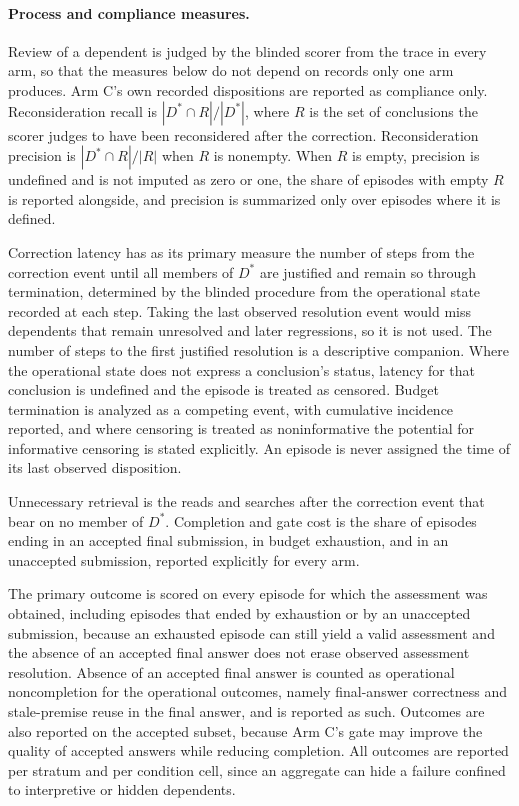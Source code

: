 \documentclass[11pt]{article}
\begin{document}
\paragraph{Process and compliance measures.} Review of a dependent is judged by the blinded scorer from the trace in every arm, so that the measures below do not depend on records only one arm produces. Arm C's own recorded dispositions are reported as compliance only.
Reconsideration recall is $|D^{*}\cap R|/|D^{*}|$, where $R$ is the set of conclusions the scorer judges to have been reconsidered after the correction. Reconsideration precision is $|D^{*}\cap R|/|R|$ when $R$ is nonempty. When $R$ is empty, precision is undefined and is not imputed as zero or one, the share of episodes with empty $R$ is reported alongside, and precision is summarized only over episodes where it is defined.

Correction latency has as its primary measure the number of steps from the correction event until all members of $D^{*}$ are justified and remain so through termination, determined by the blinded procedure from the operational state recorded at each step. Taking the last observed resolution event would miss dependents that remain unresolved and later regressions, so it is not used. The number of steps to the first justified resolution is a descriptive companion. Where the operational state does not express a conclusion's status, latency for that conclusion is undefined and the episode is treated as censored. Budget termination is analyzed as a competing event, with cumulative incidence reported, and where censoring is treated as noninformative the potential for informative censoring is stated explicitly. An episode is never assigned the time of its last observed disposition.

Unnecessary retrieval is the reads and searches after the correction event that bear on no member of $D^{*}$. Completion and gate cost is the share of episodes ending in an accepted final submission, in budget exhaustion, and in an unaccepted submission, reported explicitly for every arm.

The primary outcome is scored on every episode for which the assessment was obtained, including episodes that ended by exhaustion or by an unaccepted submission, because an exhausted episode can still yield a valid assessment and the absence of an accepted final answer does not erase observed assessment resolution. Absence of an accepted final answer is counted as operational noncompletion for the operational outcomes, namely final-answer correctness and stale-premise reuse in the final answer, and is reported as such. Outcomes are also reported on the accepted subset, because Arm C's gate may improve the quality of accepted answers while reducing completion. All outcomes are reported per stratum and per condition cell, since an aggregate can hide a failure confined to interpretive or hidden dependents.
\end{document}
